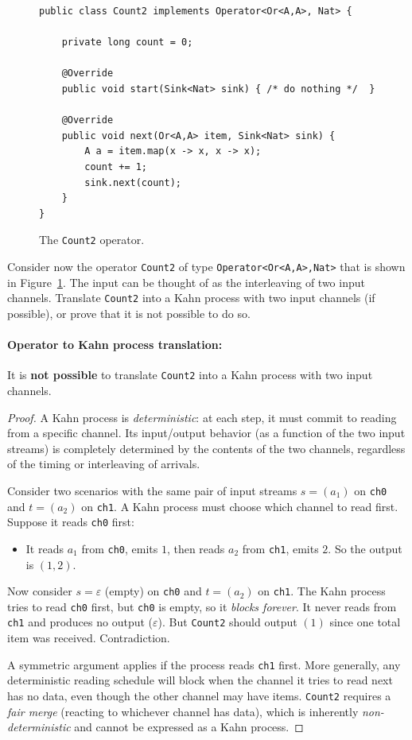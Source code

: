 \documentclass[11pt]{article}
\newcommand{\mnt}[1]{{\small\texttt{#1}}}
\theoremstyle{definition}
\begin{document}
\begin{figure}[t!]
	\footnotesize
	\begin{verbatim}
public class Count2 implements Operator<Or<A,A>, Nat> {

	private long count = 0;

	@Override
	public void start(Sink<Nat> sink) { /* do nothing */  }

	@Override
	public void next(Or<A,A> item, Sink<Nat> sink) {
		A a = item.map(x -> x, x -> x);
		count += 1;
		sink.next(count);
	}
}
\end{verbatim}
	\caption{The \mnt{Count2} operator.}
	\label{fig:count2}
\end{figure}

Consider now the operator \mnt{Count2} of type \mnt{Operator<Or<A,A>,Nat>} that is shown in Figure~\ref{fig:count2}. The input can be thought of as the interleaving of two input channels. Translate \mnt{Count2} into a Kahn process with two input channels (if possible), or prove that it is not possible to do so.

\paragraph{Operator to Kahn process translation:}

It is \textbf{not possible} to translate \mnt{Count2} into a Kahn process with two input channels.

\begin{proof}
	A Kahn process is \emph{deterministic}: at each step, it must commit to reading from a specific channel. Its input/output behavior (as a function of the two input streams) is completely determined by the contents of the two channels, regardless of the timing or interleaving of arrivals.

	Consider two scenarios with the same pair of input streams $s = (a_1)$ on \mnt{ch0} and $t = (a_2)$ on \mnt{ch1}. A Kahn process must choose which channel to read first. Suppose it reads \mnt{ch0} first:
	\begin{itemize}
		\item It reads $a_1$ from \mnt{ch0}, emits $1$, then reads $a_2$ from \mnt{ch1}, emits $2$. So the output is $(1, 2)$.
	\end{itemize}
	Now consider $s = \varepsilon$ (empty) on \mnt{ch0} and $t = (a_2)$ on \mnt{ch1}. The Kahn process tries to read \mnt{ch0} first, but \mnt{ch0} is empty, so it \emph{blocks forever}. It never reads from \mnt{ch1} and produces no output ($\varepsilon$). But \mnt{Count2} should output $(1)$ since one total item was received. Contradiction.

	A symmetric argument applies if the process reads \mnt{ch1} first. More generally, any deterministic reading schedule will block when the channel it tries to read next has no data, even though the other channel may have items. \mnt{Count2} requires a \emph{fair merge} (reacting to whichever channel has data), which is inherently \emph{non-deterministic} and cannot be expressed as a Kahn process.
\end{proof}
\end{document}
